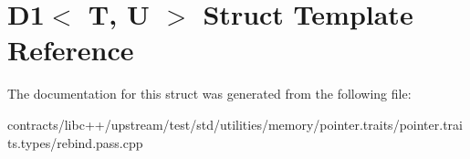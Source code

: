 \hypertarget{struct_d1}{}\section{D1$<$ T, U $>$ Struct Template Reference}
\label{struct_d1}


The documentation for this struct was generated from the following file\+:\begin{DoxyCompactItemize}
\item 
contracts/libc++/upstream/test/std/utilities/memory/pointer.\+traits/pointer.\+traits.\+types/rebind.\+pass.\+cpp\end{DoxyCompactItemize}
